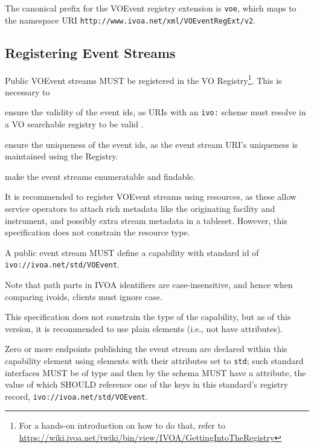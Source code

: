 \documentclass[11pt,a4paper]{ivoa}
\begin{document}
The canonical prefix for the VOEvent registry extension is \verb|voe|,
which maps to the namespace URI
\nolinkurl{http://www.ivoa.net/xml/VOEventRegExt/v2}.

\subsection{Registering Event Streams}
\label{sec:registering}

Public VOEvent streams MUST be registered in the VO
Registry\footnote{For a hands-on introduction on how to do that, refer
to
\url{https://wiki.ivoa.net/twiki/bin/view/IVOA/GettingIntoTheRegistry}}.
This is necessary to

\begin{compactitem}
\item ensure the validity of the event ids, as URIs with an \verb|ivo:|
scheme must resolve in a VO searchable registry to be valid
\citep{2016ivoa.spec.0523D}.
\item ensure the uniqueness of the event ids, as the event stream URI's
uniqueness is maintained using the Registry.
\item make the event streams enumeratable and findable.
\end{compactitem}

It is recommended to register VOEvent streams using
 resources, as these allow service operators
to attach rich metadata like the originating facility and instrument, and
possibly extra stream metadata in a tableset.  However, this
specification does not constrain the resource type.

A public event stream MUST define a capability with standard id of
\nolinkurl{ivo://ivoa.net/std/VOEvent}.

Note that path parts in IVOA identifiers are case-insensitive, and hence
when comparing ivoids, clients must ignore case.

This specification does not constrain the type of the capability, but as
of this version, it is recommended to use plain 
elements (i.e., not have  attributes).

Zero or more endpoints publishing the event stream are declared within
this capability element using  elements with their
 attributes set to \verb|std|; such standard interfaces MUST
be of type  and then by the schema MUST have
a  attribute, the value of which SHOULD reference one
of the keys in this standard's registry record,
\nolinkurl{ivo://ivoa.net/std/VOEvent}.
\end{document}
